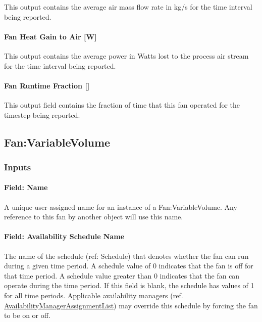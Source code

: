 This output contains the average air mass flow rate in kg/s for the time interval being reported.

\paragraph{Fan Heat Gain to Air {[}W{]}}\label{fan-heat-gain-to-air-w-1}

This output contains the average power in Watts lost to the process air stream for the time interval being reported.

\paragraph{Fan Runtime Fraction {[]}}\label{fan-runtime-fraction}

This output field contains the fraction of time that this fan operated for the timestep being reported.

\subsection{Fan:VariableVolume}\label{fanvariablevolume}

\subsubsection{Inputs}\label{inputs-2-016}

\paragraph{Field: Name}\label{field-name-2-015}

A unique user-assigned name for an instance of a Fan:VariableVolume. Any reference to this fan by another object will use this name.

\paragraph{Field: Availability Schedule Name}\label{field-availability-schedule-name-2-002}

The name of the schedule (ref: Schedule) that denotes whether the fan can run during a given time period. A schedule value of 0 indicates that the fan is off for that time period. A schedule value greater than 0 indicates that the fan can operate during the time period. If this field is blank, the schedule has values of 1 for all time periods. Applicable availability managers (ref. \hyperref[availabilitymanagerassignmentlist]{AvailabilityManagerAssignmentList}) may override this schedule by forcing the fan to be on or off.


